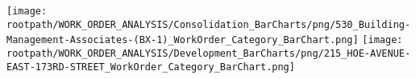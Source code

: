 \texttt{[image: \\rootpath/WORK\_ORDER\_ANALYSIS/Consolidation\_BarCharts/png/530\_Building-Management-Associates-(BX-1)\_WorkOrder\_Category\_BarChart.png]}
\texttt{[image: \\rootpath/WORK\_ORDER\_ANALYSIS/Development\_BarCharts/png/215\_HOE-AVENUE-EAST-173RD-STREET\_WorkOrder\_Category\_BarChart.png]}
